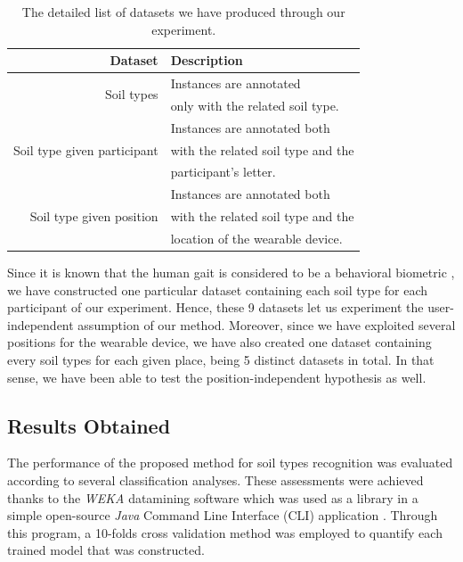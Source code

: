 \documentclass[conference]{IEEEtran}
\begin{document}
\begin{table}[!ht]
    \centering
    \caption{The detailed list of datasets we have produced through our experiment.}
    \label{tab:datasets}
    \begin{tabular}{rl}
    	\toprule
        \textbf{Dataset}&\textbf{Description}\\
        \midrule
    	\multirow{2}{*}{Soil types}&Instances are annotated\\&only with the related soil type.\\
    	\midrule    	
    	\multirow{3}{*}{Soil type given participant}&Instances are annotated both\\&with the related soil type and the\\&participant's letter.\\
    	\midrule  
    	\multirow{3}{*}{Soil type given position}&Instances are annotated both\\&with the related soil type and the\\&location of the wearable device.\\
    	\bottomrule
    \end{tabular}
\end{table}

Since it is known that the human gait is considered to be a behavioral biometric \cite{Thullier2016c}, we have constructed one particular dataset containing each soil type for each participant of our experiment. Hence, these 9 datasets let us experiment the user-independent assumption of our method. Moreover, since we have exploited several positions for the wearable device, we have also created one dataset containing every soil types for each given place, being 5 distinct datasets in total. In that sense, we have been able to test the position-independent hypothesis as well. 

\subsection{Results Obtained}

The performance of the proposed method for soil types recognition was evaluated according to several classification analyses. These assessments were achieved thanks to the \textit{WEKA} datamining software \cite{Hall2009} which was used as a library in a simple open-source \textit{Java} Command Line Interface (CLI) application \cite{Thullier2016a}. Through this program, a 10-folds cross validation method was employed to quantify each trained model that was constructed. 
\end{document}
